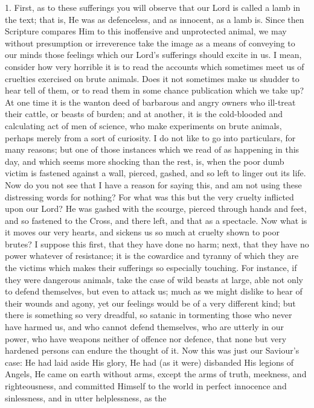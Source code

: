 1. First, as to these sufferings you will observe that our Lord is
called a lamb in the text; that is, He was as defenceless, and as
innocent, as a lamb is. Since then Scripture compares Him to this
inoffensive and unprotected animal, we may without presumption or
irreverence take the image as a means of conveying to our minds those
feelings which our Lord's sufferings should excite in us. I mean,
consider how very horrible it is to read the accounts which sometimes
meet us of cruelties exercised on brute animals. Does it not sometimes
make us shudder to hear tell of them, or to read them in some chance
publication which we take up? At one time it is the wanton deed of
barbarous and angry owners who ill-treat their cattle, or beasts of
burden; and at another, it is the cold-blooded and calculating act of
men of science, who make experiments on brute animals, perhaps merely
from a sort of curiosity. I do not like to go into particulars, for
many reasons; but one of those instances which we read of as happening
in this day, and which seems more shocking than the rest, is, when the
poor dumb victim is fastened against a wall, pierced, gashed, and so
left to linger out its life. Now do you not see that I have a reason
for saying this, and am not using these distressing words for nothing?
For what was this but the very cruelty inflicted upon our Lord? He was
gashed with the scourge, pierced through hands and feet, and so
fastened to the Cross, and there left, and that as a spectacle. Now
what is it moves our very hearts, and sickens us so much at cruelty
shown to poor brutes? I suppose this first, that they have done no
harm; next, that they have no power whatever of resistance; it is the
cowardice and tyranny of which they are the victims which makes their
sufferings so especially touching. For instance, if they were
dangerous animals, take the case of wild beasts at large, able not
only to defend themselves, but even to attack us; much as we might
dislike to hear of their wounds and agony, yet our feelings would be
of a very different kind; but there is something so very dreadful, so
satanic in tormenting those who never have harmed us, and who cannot
defend themselves, who are utterly in our power, who have weapons
neither of offence nor defence, that none but very hardened persons
can endure the thought of it. Now this was just our Saviour's case: He
had laid aside His glory, He had (as it were) disbanded His legions of
Angels, He came on earth without arms, except the arms of truth,
meekness, and righteousness, and committed Himself to the world in
perfect innocence and sinlessness, and in utter helplessness, as the
